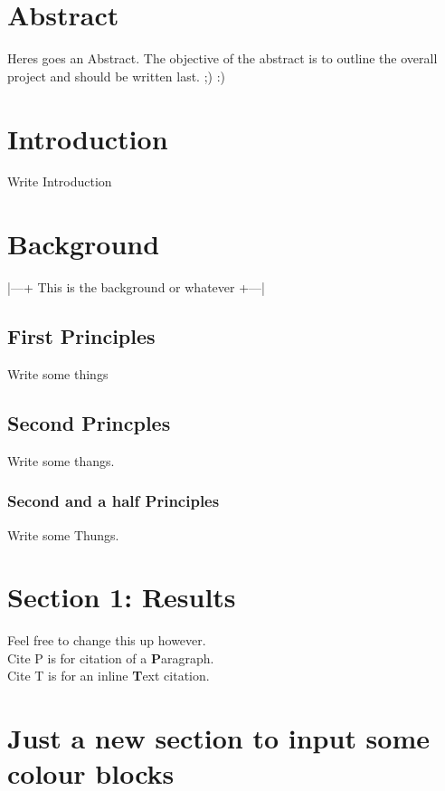 




\section*{Abstract}
Heres goes an Abstract. The objective of the abstract is to outline the overall project and should be written last. ;) :)

\tableofcontents
\clearpage
{}
\section{Introduction}
Write Introduction
\R \I \C \Z

\section{Background}
|---+ This is the background or whatever +---|

\subsection{First Principles}
Write some things

\subsection{Second Princples}
Write some thangs.

\subsubsection{Second and a half Principles}
Write some Thungs.


\section{Section 1: Results}
Feel free to change this up however. \\
\citep{harris2004} Cite P is for citation of a \textbf{P}aragraph.\\
\citet{harris2021} Cite T is for an inline \textbf{T}ext citation.

\section{Just a new section to input some colour blocks}

\clearpage


